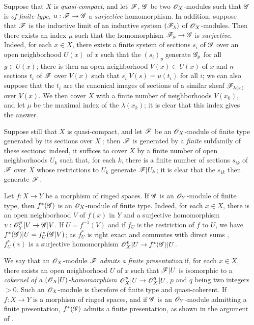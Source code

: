 \begin{env}[5.2.3]
\label{0.5.2.3}
Suppose that $X$ is {\em quasi-compact}, and let $\mathscr{F}$, $\mathscr{G}$ be two $\mathscr{O}_X$-modules
such that $\mathscr{G}$ is {\em of finite type}, $u:\mathscr{F}\to\mathscr{G}$ a {\em surjective}
homomorphism. In addition, suppose that $\mathscr{F}$ is the inductive limit of an inductive
system $(\mathscr{F}_\lambda)$ of $\mathscr{O}_X$-modules. Then there exists an index $\mu$ such that the
homomorphism $\mathscr{F}_\mu\to\mathscr{G}$ is {\em surjective}. Indeed, for each $x\in X$, there
exists a finite system of sections $s_i$ of $\mathscr{G}$ over an open neighborhood $U(x)$ of $x$
such that the $(s_i)_y$ generate $\mathscr{G}_y$ for all $y\in U(x)$; there is then an open
neighborhood $V(x)\subset U(x)$ of $x$ and $n$ sections $t_i$ of $\mathscr{F}$ over $V(x)$ such
that $s_i|V(s)=u(t_i)$ for all $i$; we can also suppose that the $t_i$ are the canonical
images of sections of a similar sheaf $\mathscr{F}_{\lambda(x)}$ over $V(x)$. We then cover $X$
with a finite number of neighborhoods $V(x_k)$, and let $\mu$ be the maximal index of the
$\lambda(x_k)$; it is clear that this index gives the answer.

Suppose still that $X$ is quasi-compact, and let $\mathscr{F}$ be an $\mathscr{O}_X$-module of finite type
generated by its sections over $X$ ; then $\mathscr{F}$ is generated by a
{\em finite} subfamily of these sections: indeed, it suffices to cover $X$ by a finite
number of open neighborhoods $U_k$ such that, for each $k$, there is a finite number of
sections $s_{ik}$ of $\mathscr{F}$ over $X$ whose restrictions to $U_k$ generate $\mathscr{F}|U_k$; it
is clear that the $s_{ik}$ then generate $\mathscr{F}$.
\end{env}

\begin{env}[5.2.4]
\label{0.5.2.4}
Let $f:X\to Y$ be a morphism of ringed spaces. If $\mathscr{G}$ is an $\mathscr{O}_Y$-module of finite
type, then $f^*(\mathscr{G})$ is an $\mathscr{O}_X$-module of finite type. Indeed, for each $x\in X$,
there is an open neighborhood $V$ of $f(x)$ in $Y$ and a surjective homomorphism
$v:\mathscr{O}_Y^p|V\to\mathscr{G}|V$. If $U=f^{-1}(V)$ and if $f_U$ is the restriction of $f$ to $U$, we
have $f^*(\mathscr{G})|U=f_U^*(\mathscr{G}|V)$; as $f_U^*$ is right exact  and
commutes with direct sums , $f_U^*(v)$ is a surjective homomorphism
$\mathscr{O}_X^p|U\to f^*(\mathscr{G})|U$.
\end{env}

\begin{env}[5.2.5]
\label{0.5.2.5}
We say that an $\mathscr{O}_X$-module $\mathscr{F}$ {\em admits a finite presentation} if, for each
$x\in X$, there exists an open neighborhood $U$ of $x$ such that $\mathscr{F}|U$ is isomorphic
to a {\em cokernel of a $(\mathscr{O}_X|U)$-homomorphism $\mathscr{O}_X^p|U\to\mathscr{O}_X^q|U$}, $p$ and $q$ being
two integers $>0$. Such an $\mathscr{O}_X$-module is therefore of finite type and quasi-coherent. If
$f:X\to Y$ is a morphism of ringed spaces, and if $\mathscr{G}$ is an $\mathscr{O}_Y$-module admitting a
finite presentation, $f^*(\mathscr{G})$ admits a finite presentation, as shown in the argument of
.
\end{env}

